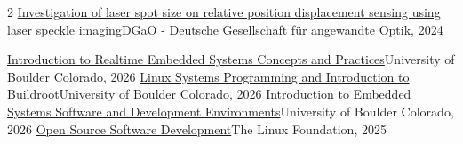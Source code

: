 \documentclass[9pt,a4paper,withhyper]{altacv}
\begin{document}
\begin{paracol}{2}
  \cvachievement{\faCertificate} 
  {\href{https://www.dgao-proceedings.de/download/125/125_p10.pdf}{Investigation of laser spot size on relative position displacement sensing using laser speckle imaging}}{DGaO - Deutsche Gesellschaft für angewandte Optik, 2024}

  \cvachievement{\faCertificate} 
  {\href{https://coursera.org/verify/WKAEU5CXMT0V}{Introduction to Realtime Embedded Systems Concepts and Practices}}{University of Boulder Colorado, 2026}
  \cvachievement{\faCertificate} 
  {\href{https://www.coursera.org/verify/WYCY2A5EZ6RG}{Linux Systems Programming and Introduction to Buildroot}}{University of Boulder Colorado, 2026}
  \cvachievement{\faCertificate} 
  {\href{https://www.coursera.org/verify/QGONDNKH2CED}{Introduction to Embedded Systems Software and Development Environments}}{University of Boulder Colorado, 2026}
  \cvachievement{\faCertificate} 
  {\href{https://www.coursera.org/verify/specialization/ZUCSRB5PTGA4}{Open Source Software Development}}{The Linux Foundation, 2025}

  \divider


%

\end{paracol}
\end{document}
